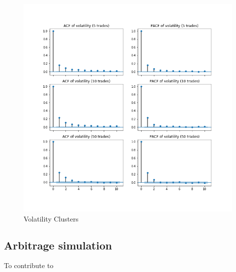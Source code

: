 \begin{figure}
    \includegraphics[width=\linewidth]{plots/basic_volaclusters_intraday.png}
    \caption{Volatility Clusters}
    \label{fig:basic_volaclusters}
\end{figure}

\subsection{Arbitrage simulation}

To contribute to 
